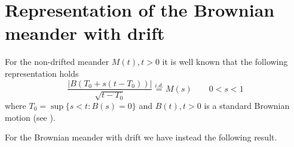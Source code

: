 
\section{Representation of the Brownian meander with drift}

For the non-drifted meander $ M(t), t>0 $ it is well known that the following representation holds
\begin{equation}\label{eq:mdr-repr}
\frac{
\Big|  B(T_0 + s (t - T_0)) \Big|
}{\sqrt{t - T_0}}
\stackrel{i.d.}{=} M(s) \qquad 0 < s < 1
\end{equation}
%
%
where $ T_0 =  \sup\{  s < t : B(s) = 0\} $ and $ B(t), t>0  $  is a standard Brownian motion (see \citet{pitman99}).

For the Brownian meander with drift we have instead the following result.

